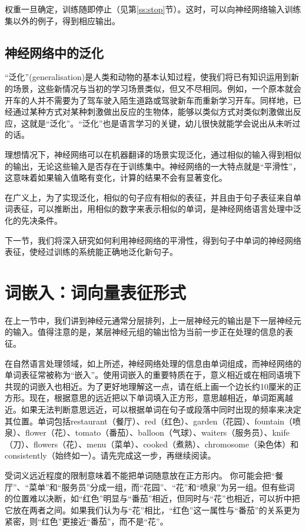 \documentclass[output=paper,colorlinks,citecolor=brown]{langscibook}
\begin{document}
权重一旦确定，训练随即停止（见第\ref{ss:stop}节）。这时，可以向神经网络输入训练集以外的例子，得到相应输出。


\subsection{神经网络中的泛化}

“泛化”(generalisation)是人类和动物的基本认知过程，使我们将已有知识运用到新的场景，这些新情况与当初的学习场景类似，但又不尽相同。例如，一个原本就会开车的人并不需要为了驾车驶入陌生道路或驾驶新车而重新学习开车。同样地，已经通过某种方式对某种刺激做出反应的生物体，能够以类似方式对类似刺激做出反应，这就是“泛化”。“泛化”也是语言学习的关键，幼儿很快就能学会说出从未听过的话。

理想情况下，神经网络可以在机器翻译的场景实现泛化，通过相似的输入得到相似的输出，无论这些输入是否存在于训练集中。神经网络的一大特点就是“平滑性”，这意味着如果输入值略有变化，计算的结果不会有显著变化。

在广义上，为了实现泛化，相似的句子应有相似的表征，并且由于句子表征来自单词表征，可以推断出，用相似的数字来表示相似的单词，是神经网络语言处理中泛化的先决条件。

下一节，我们将深入研究如何利用神经网络的平滑性，得到句子中单词的神经网络表征，使经过训练的系统能正确地泛化新句子。


\section{词嵌入：词向量表征形式}
\label{se:embed}

在上一节中，我们讲到神经元通常分层排列，上一层神经元的输出是下一层神经元的输入。值得注意的是，某层神经元组的输出恰为当前一步正在处理的信息的表征。

在自然语言处理领域，如上所述，神经网络处理的信息由单词组成，而神经网络的单词表征常被称为“嵌入”\citep{Mikolov2013}。使用词嵌入的重要特质在于，意义相近或在相同语境下共现的词嵌入也相近。为了更好地理解这一点，请在纸上画一个边长约10厘米的正方形。现在，根据意思的远近把以下单词填入正方形，意思越相近，单词距离越近。如果无法判断意思远近，可以根据单词在句子或段落中同时出现的频率来决定其位置。单词包括restaurant（餐厅）、red（红色）、garden（花园）、fountain（喷泉）、flower（花）、tomato（番茄）、balloon（气球）、waiters（服务员）、knife（刀）、flowers（花）、menu（菜单）、cooked（煮熟）、chromosome（染色体）和consistently（始终如一）。请先完成这一步，再继续阅读。

受词义远近程度的限制意味着不能把单词随意放在正方形内。 你可能会把“餐厅”、“菜单”和“服务员”分成一组，而“花园”、“花”和“喷泉”为另一组。但有些词的位置难以决断，如“红色”明显与“番茄”相近，但同时与“花”也相近，可以折中把它放在两者之间。如果我们认为与“花”相比，“红色”这一属性与“番茄”的关系更为紧密，则“红色”更接近“番茄”，而不是“花”。
\end{document}
